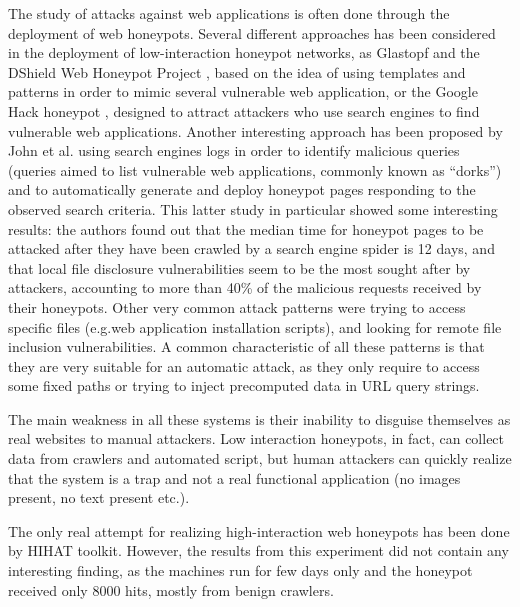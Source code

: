 The study of attacks against web applications is often done through the deployment of web honeypots. Several different approaches has been considered in the deployment of low-interaction honeypot networks, as Glastopf \cite{glastopf} and the DShield Web Honeypot Project \cite{dswhp}, based on the idea of using templates and patterns in order to mimic several vulnerable web application, or the Google Hack honeypot \cite{googleHoney}, designed to attract attackers who use search engines to find vulnerable web applications. Another interesting approach has been proposed by John et al. \cite{johnhsh} using search engines logs in order to identify malicious queries (queries aimed to list vulnerable web applications, commonly known as ``dorks'') and to automatically generate and deploy honeypot pages responding to the observed search criteria. This latter study in particular showed some interesting results: the authors found out that the median time for honeypot pages to be attacked after they have been crawled by a search engine spider is 12 days, and that local file disclosure vulnerabilities seem to be the most sought after by attackers, accounting to more than 40\% of the malicious requests received by their honeypots. Other very common attack patterns were trying to access specific files (e.g.web application installation scripts), and looking for remote file inclusion vulnerabilities. A common characteristic of all these patterns is that they are very suitable for an automatic attack, as they only require to access some fixed paths or trying to inject precomputed data in URL query strings.

The main weakness in all these systems is their inability to disguise themselves as real websites to manual attackers. Low interaction honeypots, in fact, can collect data from crawlers and automated script, but human attackers can quickly realize that the system is a trap and not a real functional application (no images present, no text present etc.).

The only real attempt for realizing high-interaction web honeypots has been done by HIHAT \cite{hihat} toolkit. However, the results from this experiment did not contain any interesting finding, as the machines run for few days only and the honeypot received only 8000 hits, mostly from benign crawlers.

